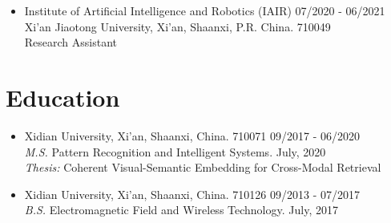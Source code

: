 \documentclass[margin,line,pifont,palatino,courier]{res}
\newenvironment{list1}{
  \begin{list}{\ding{113}}{%
      \setlength{\itemsep}{0in}
      \setlength{\parsep}{0in} \setlength{\parskip}{0in}
      \setlength{\topsep}{0in} \setlength{\partopsep}{0in}
      \setlength{\leftmargin}{0.17in}}}{\end{list}}
\newenvironment{list2}{
  \begin{list}{$\bullet$}{%
      \setlength{\itemsep}{0in}
      \setlength{\parsep}{0in} \setlength{\parskip}{0in}
      \setlength{\topsep}{0in} \setlength{\partopsep}{0in}
      \setlength{\leftmargin}{0.2in}}}{\end{list}}
\begin{document}
\begin{resume}
\begin{itemize}[leftmargin=*]
	\item Institute of
		Artificial Intelligence and Robotics (IAIR) \hfill 07/2020 - 06/2021 \\
		Xi'an Jiaotong University, Xi'an, Shaanxi, P.R. China. 710049\\
		Research Assistant
\end{itemize}

\section{\sc Education}

\begin{itemize}[leftmargin=*]
\item Xidian University, Xi'an, Shaanxi, China. 710071 \hfill 09/2017 - 06/2020\\
	\textit{M.S.} Pattern Recognition and Intelligent Systems. July, 2020\\
	\textit{Thesis:} Coherent Visual-Semantic Embedding for Cross-Modal Retrieval
\item Xidian University, Xi'an, Shaanxi, China. 710126 \hfill 09/2013 - 07/2017\\
	\textit{B.S.} Electromagnetic Field and Wireless Technology. July, 2017
\end{itemize}

%
%
%


\end{resume}
\end{document}
